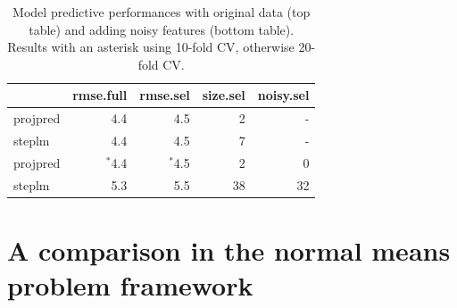 \documentclass[american,]{article}
\theoremstyle{definition}
\begin{document}
\begin{table}[tp]
\scriptsize
\centering
\begin{tabular}{l|r|r|r|r}
  \hline
 & rmse.full & rmse.sel & size.sel & noisy.sel \\ 
  \hline
projpred & 4.4 & 4.5 & 2 & -  \\
steplm & 4.4 & 4.5 & 7 & - \\
\hline
\hline
projpred & $^{*}$4.4 & $^{*}$4.5 & 2 & 0  \\
steplm & 5.3 & 5.5 & 38 & 32 \\
   \hline
\end{tabular}
\caption{Model predictive performances with original data (top table) and adding noisy features (bottom table). Results with an asterisk using 10-fold CV, otherwise 20-fold CV.}
\label{tab:model_performances}
\end{table}


\hypertarget{comparison}{%
\section{A comparison in the normal means problem framework}\label{comparison}}
\end{document}
